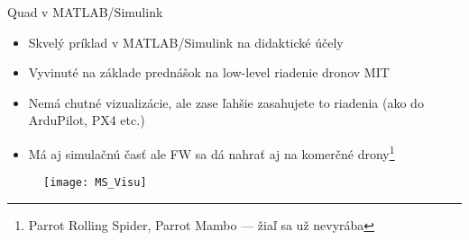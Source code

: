 \begin{frame}{Quad v MATLAB/Simulink}
\begin{itemize}
\item<1-> Skvelý príklad v MATLAB/Simulink na didaktické účely
\item<2-> Vyvinuté na základe prednášok na low-level riadenie dronov MIT \citep{Riether2016}
\item<3-> Nemá chutné vizualizácie, ale zase ľahšie zasahujete to riadenia (ako do ArduPilot, PX4 etc.)
    \item<4-> Má aj simulačnú časť ale FW sa dá nahrať aj na komerčné drony\footnote{Parrot Rolling Spider, Parrot Mambo --- žiaľ sa už nevyrába}
        
\end{itemize}
  \begin{figure}
\centering
  \texttt{[image: MS\_Visu]}\\
\end{figure}
\end{frame}


